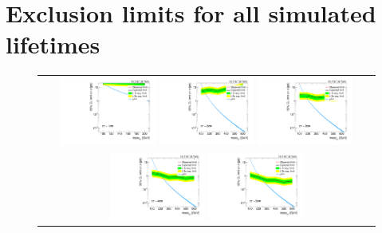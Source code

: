 \clearpage
\chapter{Exclusion limits for all simulated lifetimes}
\label{app:LimitPlots2d}

\begin{figure}[!h]
  \centering 
  \begin{tabular}{c}
    \includegraphics[width=0.29\textwidth]{figures/analysis/Interpretation/ExclusionLimits/LimitPlot_ctau1cm.pdf} 
    \includegraphics[width=0.29\textwidth]{figures/analysis/Interpretation/ExclusionLimits/LimitPlot_ctau2cm.pdf} 
    \includegraphics[width=0.29\textwidth]{figures/analysis/Interpretation/ExclusionLimits/LimitPlot_ctau3cm.pdf} \\
    \includegraphics[width=0.29\textwidth]{figures/analysis/Interpretation/ExclusionLimits/LimitPlot_ctau4cm.pdf} 
    \includegraphics[width=0.29\textwidth]{figures/analysis/Interpretation/ExclusionLimits/LimitPlot_ctau5cm.pdf} 

\end{tabular}
\end{figure}
